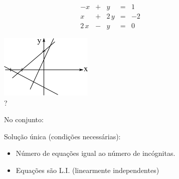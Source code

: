 \begin{description}
\begin{enumerar}
\item

\begin{figure}[htb]
 \centering
 \begin{minipage}[c]{3cm}
    \[
     \begin{array}{rrrrr}
      -x & + & y & = & 1 \\
      x & + & 2\,y & = & -2 \\
      2\,x & - & y & = & 0
     \end{array}
    \]
 \end{minipage}\hspace*{2cm}
 \begin{minipage}[c]{5cm}
    \includegraphics[scale=0.8]{capitulos/capitulo4/figuras/prob_nao_resol3.png}
    \caption{?}
    \label{fig:prob_nao_resol3}
 \end{minipage}
\end{figure}

\end{enumerar}

\end{description}

\begin{description}

\item[] No conjunto:


\item[] Solução única (condições necessárias):

\begin{itemize}

\item Número de equações igual ao número de incógnitas.

\item Equações são L.I. (linearmente independentes)

\end{itemize}

\end{description}